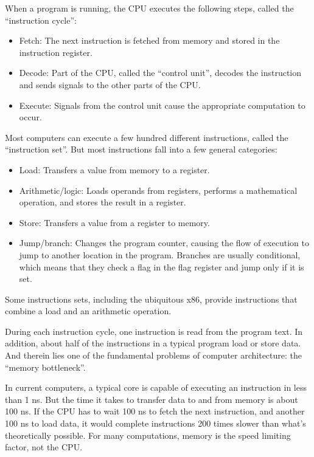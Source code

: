 \documentclass[12pt]{book}
\begin{document}
When a program is running, the CPU executes the following steps,
called the ``instruction cycle'':

\begin{itemize}

\item Fetch: The next instruction is fetched from memory and stored
in the instruction register.

\item Decode: Part of the CPU, called the ``control unit'', decodes
the instruction and sends signals to the other parts of
the CPU.

\item Execute: Signals from the control unit cause the appropriate
  computation to occur.

\end{itemize}

Most computers can execute a few hundred different instructions,
called the ``instruction set''.  But most instructions fall
into a few general categories:

\begin{itemize}

\item Load: Transfers a value from memory to a register.

\item Arithmetic/logic: Loads operands from registers, performs
a mathematical operation, and stores the result in a register.

\item Store: Transfers a value from a register to memory.

\item Jump/branch: Changes the program counter, causing the flow
of execution to jump to another location in the program.  Branches
are usually conditional, which means that they check a flag
in the flag register and jump only if it is set.

\end{itemize}

Some instructions sets, including the ubiquitous x86, provide
instructions that combine a load and an arithmetic operation.

During each instruction cycle, one instruction is read from the
program text.  In addition, about half of the instructions in a
typical program load or store data.  And therein
lies one of the fundamental problems of computer architecture: the
``memory bottleneck''.

In current computers, a typical core is capable of executing an instruction in less than 1 ns.  But the time it takes to transfer data to and from memory is about 100 ns.  If the CPU has to wait 100 ns to fetch the next instruction, and another 100 ns to load data, it would complete instructions 200 times slower than what's theoretically possible.  For many computations, memory is the speed limiting factor, not the CPU.
\end{document}

